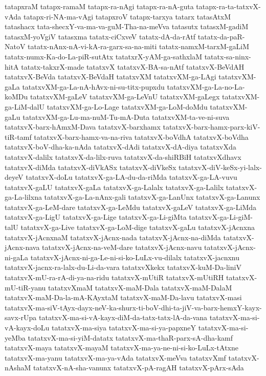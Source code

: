{tatapxraM
tatapx-ramaM
tatapx-ra-nAgi
tatapx-ra-nA-guta
tatapx-ra-ta-tatxvX-vAda
tatapx-ri-NA-ma-vAgi
tatapxroV
tatapx-tarxya
tatarx
tatasAtxM
tatashacx
tata-shecxY-va-ma-va-guM-Tha-na-meVva
tatasutx
tatasxM-gadiM
tatasxM-yoVgiV
tatasxma
tatatx-ciCxveV
tatatx-dA-da-rAtf
tatatx-da-paR-NatoV
tatatx-nAnx-nA-vi-kA-ra-garx-sa-na-miti
tatatx-namxM-tarxM-gaLiM
tatatx-numx-Ka-do-La-piR-sutAtx
tatatxrX-yAM-ga-sathxlaM
tatatx-sa-ninx-hitA
tatatx-takxrX-made
tatatxvX
tatatxvX-BA-sa-nAtf
tatatxvX-BeVdAH
tatatxvX-BeVda
tatatxvX-BeVdaH
tatatxvXM
tatatxvXM-ga-LAgi
tatatxvXM-gaLa
tatatxvXM-ga-La-nA-hAvx-ni-su-titx-pupxdu
tatatxvXM-ga-La-no-La-koMDu
tatatxvXM-gaLeV
tatatxvXM-ga-LeVnU
tatatxvXM-gaLegx
tatatxvXM-ga-LiM-dalU
tatatxvXM-ga-Lo-Lage
tatatxvXM-ga-LoM-doMdu
tatatxvXM-gaLu
tatatxvXM-ga-Lu-ma-nuM-Tu-mA-Duta
tatatxvXM-ta-ve-ni-suva
tatatxvX-barx-hAmxM-Dava
tatatxvX-barxhamx
tatatxvX-barx-hamx-parx-kiV-tiR-tamf
tatatxvX-barx-hamx-va-na-riva
tatatxvX-boVdhA
tatatxvX-boVdha
tatatxvX-boV-dha-ka-nAda
tatatxvX-dAdi
tatatxvX-dA-diya
tatatxvXda
tatatxvX-dalilx
tatatxvX-da-lilx-ruva
tatatxvX-da-shiRBiH
tatatxvXdhavx
tatatxvX-diMda
tatatxvX-diVkASx
tatatxvX-diVkeSx
tatatxvX-diV-keSx-yi-lalx-deyeV
tatatxvX-doLu
tatatxvX-ga-LA-du-da-riMda
tatatxvX-ga-LA-vuvu
tatatxvX-gaLU
tatatxvX-gaLa
tatatxvX-ga-Lalalx
tatatxvX-ga-Lalilx
tatatxvX-ga-La-lilxna
tatatxvX-ga-La-nAnx-gali
tatatxvX-ga-LanUnx
tatatxvX-ga-Lanunx
tatatxvX-ga-LeM-dare
tatatxvX-ga-LeMdu
tatatxvX-gaLeV
tatatxvX-ga-LiMda
tatatxvX-ga-LigU
tatatxvX-ga-Lige
tatatxvX-ga-Li-giMta
tatatxvX-ga-Li-giM-talU
tatatxvX-ga-Live
tatatxvX-ga-LoM-dige
tatatxvX-gaLu
tatatxvX-jAcnxna
tatatxvX-jAcnxnaM
tatatxvX-jAcnx-nada
tatatxvX-jAcnx-na-diMda
tatatxvX-jAcnx-nava
tatatxvX-jAcnx-na-veM-dare
tatatxvX-jAcnx-navu
tatatxvX-jAcnx-ni-gaLa
tatatxvX-jAcnx-ni-ga-Le-ni-si-ko-LuLx-vu-dilalx
tatatxvX-jacnxnu
tatatxvX-jacnx-ra-lalx-du-Li-da-vara
tatatxvXkekx
tatatxvX-kuM-Da-liniV
tatatxvX-mU-ra-rA-di-ya-na-ridu
tatatxvX-mUtiR
tatatxvX-mUtiRH
tatatxvX-mU-tiR-yanu
tatatxvXmaM
tatatxvX-maM-Dala
tatatxvX-maM-DalaM
tatatxvX-maM-Da-la-mA-KAyxtaM
tatatxvX-maM-Da-lavu
tatatxvX-masi
tatatxvX-ma-siV-tAyx-dayx-neV-ka-shurx-ti-boV-dhi-ta-jiV-va-barx-hemxY-kayx-savx-rUpa
tatatxvX-ma-si-vA-kayx-diM-da-tatx-tatx-lA-da-vana
tatatxvX-ma-si-vA-kayx-doLu
tatatxvX-ma-siya
tatatxvX-ma-si-ya-papxneY
tatatxvX-ma-si-yeMba
tatatxvX-ma-si-yiM-datatx
tatatxvX-ma-thaR-parx-sA-dha-kamf
tatatxvX-maya
tatatxvX-mayaM
tatatxvX-ma-ya-ne-ni-si-ko-LuLx-tAtxne
tatatxvX-ma-yanu
tatatxvX-ma-ya-vAda
tatatxvX-meVva
tatatxvXmf
tatatxvX-nAshaM
tatatxvX-nA-sha-vanunx
tatatxvX-pA-ragAH
tatatxvX-pArx-sAda
}
